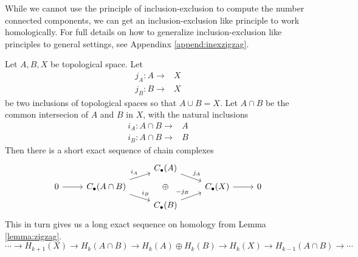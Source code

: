 While we cannot use the principle of inclusion-exclusion to compute the number connected components, we can get an inclusion-exclusion like principle to work homologically. For full details on how to generalize inclusion-exclusion like principles to general settings, see Appendinx \ref{append:inexzigzag}.
\begin{theorem}
Let $A, B, X$ be topological space. Let 
\begin{align*} j_A:A\to& X\\
j_B: B\to& X
\end{align*}
 be two inclusions of topological spaces so that $A\cup B=X$. Let $A\cap B$ be the common intersecion of $A$ and $B$ in $X$, with the natural inclusions 
 \begin{align*}
 i_A:A\cap B\to& A \\
  i_B: A \cap B\to & B
 \end{align*}
 Then there is a short exact sequence of chain complexes
 \[\begin{tikzcd}[row sep=tiny]
  \;& & C_\bullet(A) \arrow{dr}{j_A}\\
 0 \arrow{r}& C_\bullet(A\cap B)\arrow{ru}{i_A} \arrow{rd}{i_B} & \oplus & C_\bullet(X)\arrow{r} & 0\\
 & & C_\bullet(B) \arrow{ur}{-j_B}
 \end{tikzcd}\]
 This in turn gives us a long exact sequence on homology from Lemma \ref{lemma:zigzag}.
 \[\cdots\to  H_{k+1}(X)\to H_k(A\cap B)\to H_k(A)\oplus H_k(B)\to H_k(X)\to H_{k-1} (A\cap B)\to \cdots \]
\end{theorem}
